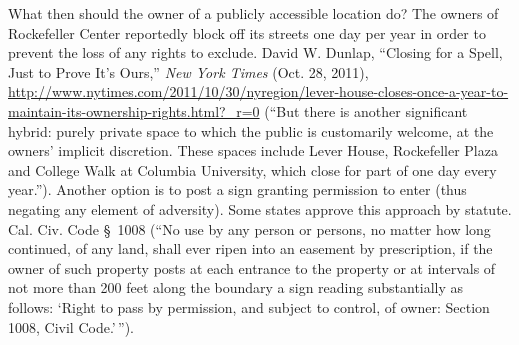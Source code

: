 
What then should the owner of a publicly accessible location do? The owners of
Rockefeller Center reportedly block off its streets one day per year in order to
prevent the loss of any rights to exclude. David W. Dunlap, ``Closing for a
Spell, Just to Prove It's Ours,'' \textit{New York Times} (Oct. 28, 2011),
\url{http://www.nytimes.com/2011/10/30/nyregion/lever-house-closes-once-a-year-to-maintain-its-ownership-rights.html?_r=0}
(``But there is another significant hybrid: purely private space to which the
public is customarily welcome, at the owners' implicit discretion. These spaces
include Lever House, Rockefeller Plaza and College Walk at Columbia University,
which close for part of one day every year.''). Another option is to post a sign
granting permission to enter (thus negating any element of adversity). Some
states approve this approach by statute. Cal. Civ. Code \S~1008 (``No use by any
person or persons, no matter how long continued, of any land, shall ever ripen
into an easement by prescription, if the owner of such property posts at each
entrance to the property or at intervals of not more than 200 feet along the
boundary a sign reading substantially as follows: `Right to pass by permission,
and subject to control, of owner: Section 1008, Civil Code.'\,'').

